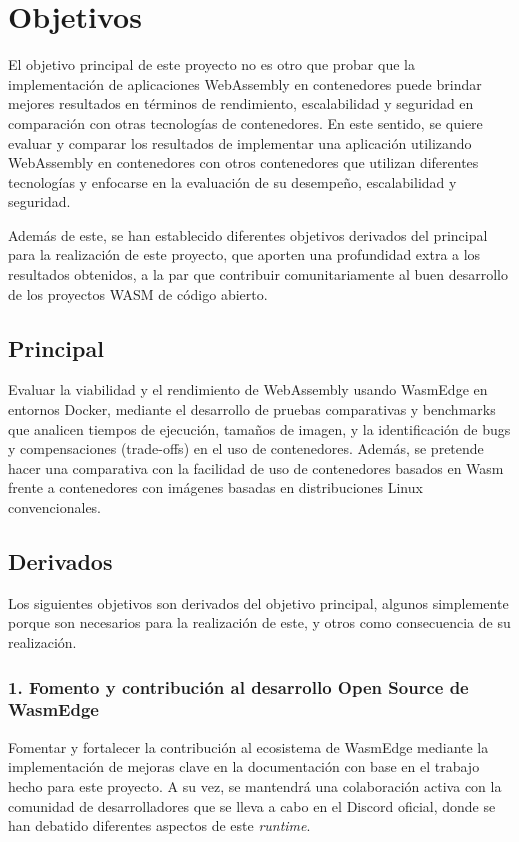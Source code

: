  
\section{Objetivos}

El objetivo principal de este proyecto no es otro que probar que la implementación de aplicaciones WebAssembly en contenedores puede brindar mejores resultados en términos de rendimiento, escalabilidad y seguridad en comparación con otras tecnologías de contenedores. En este sentido, se quiere evaluar y comparar los resultados de implementar una aplicación utilizando WebAssembly en contenedores con otros contenedores que utilizan diferentes tecnologías y enfocarse en la evaluación de su desempeño, escalabilidad y seguridad.

Además de este, se han establecido diferentes objetivos derivados del principal para la realización de este proyecto, que aporten una profundidad extra a los resultados obtenidos, a la par que contribuir comunitariamente al buen desarrollo de los proyectos WASM de código abierto.

\subsection{Principal}

Evaluar la viabilidad y el rendimiento de WebAssembly usando WasmEdge en entornos Docker, mediante el desarrollo de pruebas comparativas y benchmarks que analicen tiempos de ejecución, tamaños de imagen, y la identificación de bugs y compensaciones (trade-offs) en el uso de contenedores. Además, se pretende hacer una comparativa con la facilidad de uso de contenedores basados en Wasm frente a contenedores con imágenes basadas en distribuciones Linux convencionales.

\subsection{Derivados}

Los siguientes objetivos son derivados del objetivo principal, algunos simplemente porque son necesarios para la realización de este, y otros como consecuencia de su realización.

\subsubsection{1. Fomento y contribución al desarrollo Open Source de WasmEdge}

Fomentar y fortalecer la contribución al ecosistema de WasmEdge mediante la implementación de mejoras clave en la documentación con base en el trabajo hecho para este proyecto. A su vez, se mantendrá una colaboración activa con la comunidad de desarrolladores que se lleva a cabo en el Discord oficial, donde se han debatido diferentes aspectos de este \textit{runtime}.

